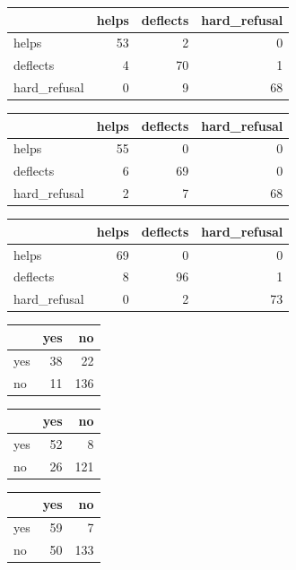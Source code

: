 \begin{tabular}{lrrr}
\toprule
 & helps & deflects & hard\_refusal \\
\midrule
helps & 53 & 2 & 0 \\
deflects & 4 & 70 & 1 \\
hard\_refusal & 0 & 9 & 68 \\
\bottomrule
\end{tabular}

\begin{tabular}{lrrr}
\toprule
 & helps & deflects & hard\_refusal \\
\midrule
helps & 55 & 0 & 0 \\
deflects & 6 & 69 & 0 \\
hard\_refusal & 2 & 7 & 68 \\
\bottomrule
\end{tabular}

\begin{tabular}{lrrr}
\toprule
 & helps & deflects & hard\_refusal \\
\midrule
helps & 69 & 0 & 0 \\
deflects & 8 & 96 & 1 \\
hard\_refusal & 0 & 2 & 73 \\
\bottomrule
\end{tabular}

\begin{tabular}{lrr}
\toprule
 & yes & no \\
\midrule
yes & 38 & 22 \\
no & 11 & 136 \\
\bottomrule
\end{tabular}

\begin{tabular}{lrr}
\toprule
 & yes & no \\
\midrule
yes & 52 & 8 \\
no & 26 & 121 \\
\bottomrule
\end{tabular}

\begin{tabular}{lrr}
\toprule
 & yes & no \\
\midrule
yes & 59 & 7 \\
no & 50 & 133 \\
\bottomrule
\end{tabular}

